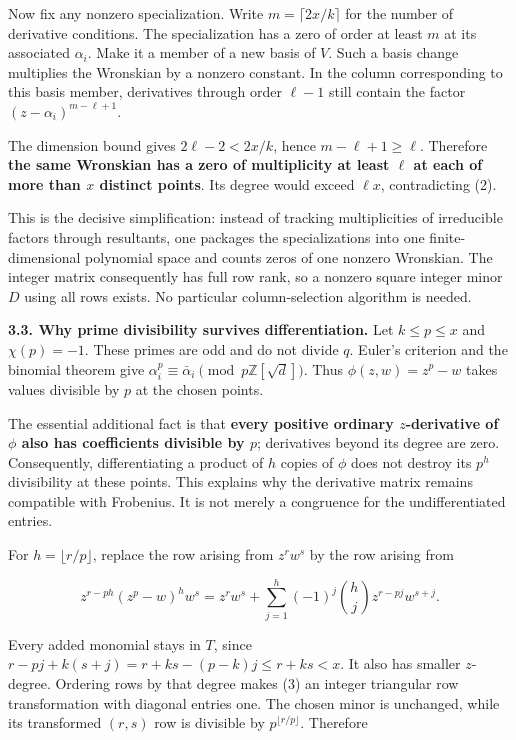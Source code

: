 \documentclass[11pt]{article}
\begin{document}
Now fix any nonzero specialization. Write \(m=\lceil2x/k\rceil\) for the number of derivative conditions. The specialization has a zero of order at least \(m\) at its associated \(\alpha_i\). Make it a member of a new basis of \(V\). Such a basis change multiplies the Wronskian by a nonzero constant. In the column corresponding to this basis member, derivatives through order \(\ell-1\) still contain the factor \((z-\alpha_i)^{m-\ell+1}\).

The dimension bound gives \(2\ell-2<2x/k\), hence \(m-\ell+1\ge\ell\). Therefore \textbf{the same Wronskian has a zero of multiplicity at least \(\ell\) at each of more than \(x\) distinct points}. Its degree would exceed \(\ell x\), contradicting (2).

This is the decisive simplification: instead of tracking multiplicities of irreducible factors through resultants, one packages the specializations into one finite-dimensional polynomial space and counts zeros of one nonzero Wronskian. The integer matrix consequently has full row rank, so a nonzero square integer minor \(D\) using all rows exists. No particular column-selection algorithm is needed.

\textbf{3.3. Why prime divisibility survives differentiation.} Let \(k\le p\le x\) and \(\chi(p)=-1\). These primes are odd and do not divide \(q\). Euler's criterion and the binomial theorem give \(\alpha_i^p\equiv\bar\alpha_i\pmod{p\mathbb Z[\sqrt d]}\). Thus \(\phi(z,w)=z^p-w\) takes values divisible by \(p\) at the chosen points.

The essential additional fact is that \textbf{every positive ordinary \(z\)-derivative of \(\phi\) also has coefficients divisible by \(p\)}; derivatives beyond its degree are zero. Consequently, differentiating a product of \(h\) copies of \(\phi\) does not destroy its \(p^h\) divisibility at these points. This explains why the derivative matrix remains compatible with Frobenius. It is not merely a congruence for the undifferentiated entries.

For \(h=\lfloor r/p\rfloor\), replace the row arising from \(z^rw^s\) by the row arising from

\[
z^{r-ph}(z^p-w)^h w^s
=z^rw^s+\sum_{j=1}^{h}(-1)^j\binom hj z^{r-pj}w^{s+j}.
\tag{3}
\]

Every added monomial stays in \(T\), since \(r-pj+k(s+j)=r+ks-(p-k)j\le r+ks<x\). It also has smaller \(z\)-degree. Ordering rows by that degree makes (3) an integer triangular row transformation with diagonal entries one. The chosen minor is unchanged, while its transformed \((r,s)\) row is divisible by \(p^{\lfloor r/p\rfloor}\). Therefore
\end{document}

